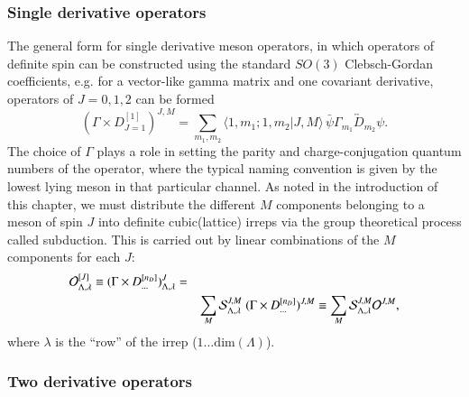 \subsubsection{Single derivative operators}
The general form for single derivative meson operators, in which operators of definite spin can be constructed using the standard $SO(3)$ Clebsch-Gordan coefficients, e.g. for a vector-like gamma matrix and one covariant derivative, operators of $J=0,1,2$ can be formed \cite{Dudek_2010}
\begin{equation}
 (\Gamma \times D^{[1]}_{J=1} )^{J, M} = \sum_{m_1, m_2}\big\langle 1, m_1 ; 1, m_2 \big| J, M
  \big\rangle\,  \bar{\psi} \Gamma_{m_1}
  \overleftrightarrow{D}_{m_2} \psi. \nonumber
\end{equation}
The choice of $\Gamma$ plays a role in setting the parity and charge-conjugation quantum numbers of the operator, where the typical naming convention is given by the lowest lying meson in that particular channel. As noted in the introduction of this chapter, we must distribute the different $M$ components belonging to a meson of spin $J$ into definite cubic(lattice) irreps via the group theoretical process called subduction. This is carried out by linear combinations of the $M$ components for each $J$\cite{Dudek_2010}:
\begin{eqnarray}
{\cal O}^{[J]}_{\Lambda,\lambda} \equiv (\Gamma \times D^{[n_D]}_{\ldots})^J_{\Lambda, \lambda} =  \nonumber\\
& & \sum_M {\cal
     S}^{J,M}_{\Lambda, \lambda}   \; (\Gamma \times
   D^{[n_D]}_{\ldots})^{J,M} \equiv \sum_M {\cal S}^{J,M}_{\Lambda,\lambda} {\cal O}^{J,M}, \nonumber
\end{eqnarray}
where $\lambda$ is the ``row'' of the irrep ($1\ldots\mathrm{dim}(\Lambda)$). 



\subsubsection{Two derivative operators}

